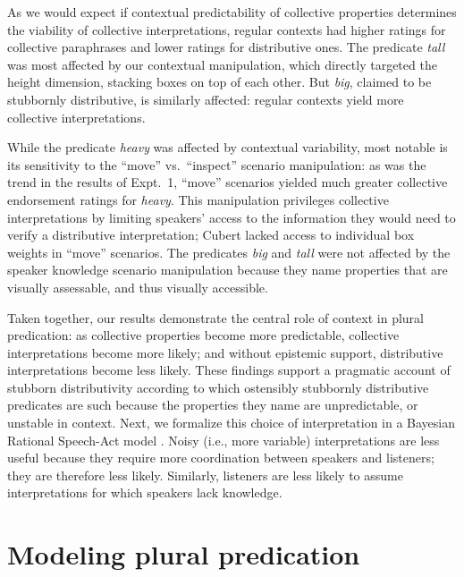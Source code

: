 \documentclass[linguex]{sp}
\begin{document}
As we would expect if contextual predictability of collective properties determines the viability of collective interpretations, regular contexts had higher ratings for collective paraphrases and lower ratings for distributive ones. The predicate \textit{tall} was most affected by our contextual manipulation, which directly targeted the height dimension, stacking boxes on top of each other. But \emph{big}, claimed to be stubbornly distributive, is similarly affected: regular contexts yield more collective interpretations. 

While the predicate \emph{heavy} was affected by contextual variability, most notable is its sensitivity to the ``move'' vs.~``inspect'' scenario manipulation: as was the trend in the results of Expt.~1, ``move'' scenarios yielded much greater collective endorsement ratings for \emph{heavy}. This manipulation privileges collective interpretations by limiting speakers' access to the information they would need to verify a distributive interpretation; Cubert lacked access to individual box weights in ``move'' scenarios. The predicates \emph{big} and \emph{tall} were not affected by the speaker knowledge scenario manipulation because they name properties that are visually assessable, and thus visually accessible.

Taken together, our results demonstrate the central role of context in plural predication: as collective properties become more predictable, collective interpretations become more likely; and without epistemic support, distributive interpretations become less likely. These findings support a pragmatic account of stubborn distributivity according to which ostensibly stubbornly distributive predicates are such because the properties they name are unpredictable, or unstable in context. Next, we formalize this choice of interpretation in a Bayesian Rational Speech-Act model \citep{frankgoodman2012,lassitergoodman2013}. Noisy (i.e., more variable) interpretations are less useful because they require more coordination between speakers and listeners; they are therefore less likely. Similarly, listeners are less likely to assume interpretations for which speakers lack knowledge.



\section{Modeling plural predication}
\end{document}
